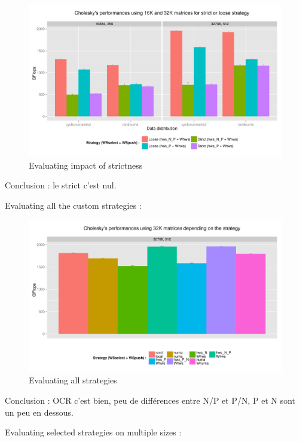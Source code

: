 \documentclass{Styles/llncs}
\begin{document}
\begin{figure}[t]
  \centering
  \includegraphics[scale=0.6]{figures/graph_strict.pdf}
\caption{Evaluating impact of strictness}
\label{fig:eval-strict}
\end{figure}

Conclusion : le strict c'est nul.

Evaluating all the custom strategies :

\begin{figure}[t]
  \centering
  \includegraphics[scale=0.6]{figures/graph_all_strat.pdf}
\caption{Evaluating all strategies}
\label{fig:eval-all-strat}
\end{figure}

Conclusion : OCR c'est bien, peu de différences entre N/P et P/N, P et N sont un peu en dessous.

Evaluating selected strategies on multiple sizes :
\end{document}
